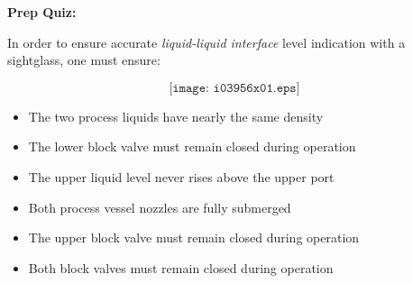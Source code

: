 \vfil \eject

\noindent
{\bf Prep Quiz:}

In order to ensure accurate {\it liquid-liquid interface} level indication with a sightglass, one must ensure:

$$\texttt{[image: i03956x01.eps]}$$

\begin{itemize}
\item{} The two process liquids have nearly the same density
\vskip 5pt 
\item{} The lower block valve must remain closed during operation
\vskip 5pt 
\item{} The upper liquid level never rises above the upper port 
\vskip 5pt 
\item{} Both process vessel nozzles are fully submerged
\vskip 5pt 
\item{} The upper block valve must remain closed during operation 
\vskip 5pt 
\item{} Both block valves must remain closed during operation
\end{itemize}





